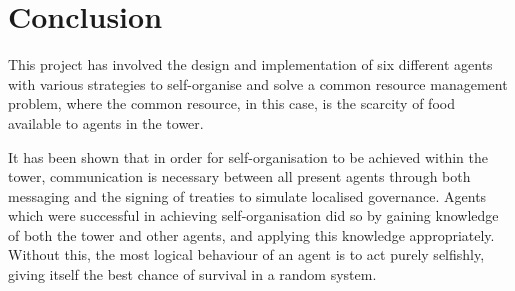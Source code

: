 \chapter{Conclusion}\label{conclusion}

This project has involved the design and implementation of six different agents with various strategies to self-organise and solve a common resource management problem, where the common resource, in this case, is the scarcity of food available to agents in the tower.

It has been shown that in order for self-organisation to be achieved within the tower, communication is necessary between all present agents through both messaging and the signing of treaties to simulate localised governance. Agents which were successful in achieving self-organisation did so by gaining knowledge of both the tower and other agents, and applying this knowledge appropriately. Without this, the most logical behaviour of an agent is to act purely selfishly, giving itself the best chance of survival in a random system.